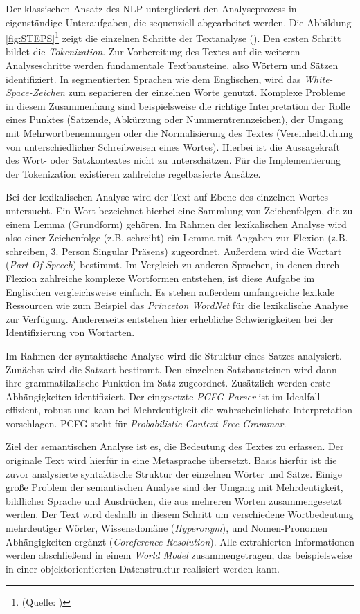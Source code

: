 Der klassischen Ansatz des \ac{NLP} untergliedert den Analyseprozess in eigenständige Unteraufgaben, die sequenziell abgearbeitet werden. Die Abbildung \ref{fig:STEPS}\footnote{(Quelle: \cite[vgl.][4]{DALE})} zeigt die einzelnen Schritte der Textanalyse (\cite[vgl.][4]{DALE}). 
Den ersten Schritt bildet die \textit{Tokenization}. Zur Vorbereitung des Textes auf die weiteren Analyseschritte werden fundamentale Textbausteine, also Wörtern und Sätzen identifiziert. In segmentierten Sprachen wie dem Englischen, wird das \textit{White-Space-Zeichen} zum separieren der einzelnen Worte genutzt. Komplexe Probleme in diesem Zusammenhang sind beispielsweise die richtige Interpretation der Rolle eines Punktes (Satzende, Abkürzung oder Nummerntrennzeichen), der Umgang mit Mehrwortbenennungen oder die Normalisierung des Textes (Vereinheitlichung von unterschiedlicher Schreibweisen eines Wortes). Hierbei ist die Aussagekraft des Wort- oder Satzkontextes nicht zu unterschätzen. Für die Implementierung der Tokenization existieren zahlreiche regelbasierte Ansätze.\par
Bei der lexikalischen Analyse wird der Text auf Ebene des einzelnen Wortes untersucht. Ein Wort bezeichnet hierbei eine Sammlung von Zeichenfolgen, die zu einem Lemma (Grundform) gehören. Im Rahmen der lexikalischen Analyse wird also einer Zeichenfolge (z.B. schreibt) ein Lemma mit Angaben zur Flexion (z.B. schreiben, 3. Person Singular Präsens) zugeordnet. Außerdem wird die Wortart (\textit{Part-Of Speech}) bestimmt. Im Vergleich zu anderen Sprachen, in denen durch Flexion zahlreiche komplexe Wortformen entstehen, ist diese Aufgabe im Englischen vergleichsweise einfach. Es stehen außerdem umfangreiche lexikale Ressourcen wie zum Beispiel das \textit{Princeton WordNet} für die lexikalische Analyse zur Verfügung. Andererseits entstehen hier erhebliche Schwierigkeiten bei der Identifizierung von Wortarten.\par
Im Rahmen der syntaktische Analyse wird die Struktur eines Satzes analysiert. Zunächst wird die Satzart bestimmt. Den einzelnen Satzbausteinen wird dann ihre grammatikalische Funktion im Satz zugeordnet. Zusätzlich werden erste Abhängigkeiten identifiziert. Der eingesetzte \textit{PCFG-Parser} ist im Idealfall effizient, robust und kann bei Mehrdeutigkeit die wahrscheinlichste Interpretation vorschlagen. PCFG steht für \textit{Probabilistic Context-Free-Grammar.}\par
Ziel der semantischen Analyse ist es, die Bedeutung des Textes zu erfassen. Der originale Text wird hierfür in eine Metasprache übersetzt. Basis hierfür ist die zuvor analysierte syntaktische Struktur der einzelnen Wörter und Sätze. Einige große Problem der semantischen Analyse sind der Umgang mit Mehrdeutigkeit, bildlicher Sprache und Ausdrücken, die aus mehreren Worten zusammengesetzt werden. Der Text wird deshalb in diesem Schritt um verschiedene Wortbedeutung mehrdeutiger Wörter, Wissensdomäne (\textit{Hyperonym}), und Nomen-Pronomen Abhängigkeiten ergänzt (\textit{Coreference Resolution}). Alle extrahierten Informationen werden abschließend in einem \textit{World Model} zusammengetragen, das beispielsweise in einer objektorientierten Datenstruktur realisiert werden kann.\par
